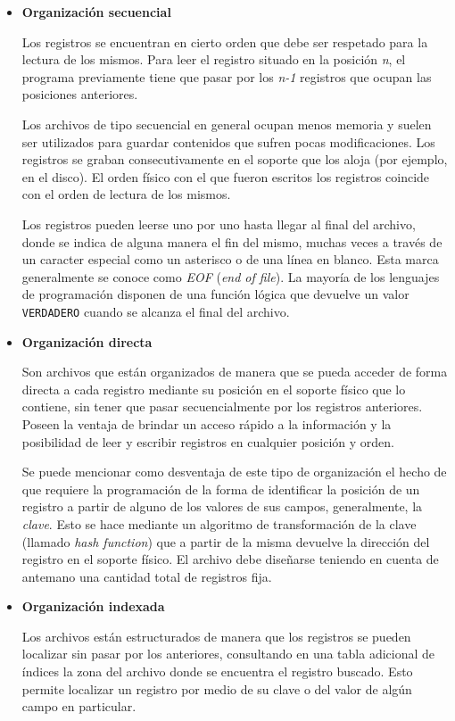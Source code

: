 \documentclass[
]{book}
\begin{document}
\begin{itemize}
\item
  \textbf{Organización secuencial}

  Los registros se encuentran en cierto orden que debe ser respetado para la lectura de los mismos. Para leer el registro situado en la posición \emph{n}, el programa previamente tiene que pasar por los \emph{n-1} registros que ocupan las posiciones anteriores.

  Los archivos de tipo secuencial en general ocupan menos memoria y suelen ser utilizados para guardar contenidos que sufren pocas modificaciones. Los registros se graban consecutivamente en el soporte que los aloja (por ejemplo, en el disco). El orden físico con el que fueron escritos los registros coincide con el orden de lectura de los mismos.

  Los registros pueden leerse uno por uno hasta llegar al final del archivo, donde se indica de alguna manera el fin del mismo, muchas veces a través de un caracter especial como un asterisco o de una línea en blanco. Esta marca generalmente se conoce como \emph{EOF} (\emph{end of file}). La mayoría de los lenguajes de programación disponen de una función lógica que devuelve un valor \texttt{VERDADERO} cuando se alcanza el final del archivo.
\item
  \textbf{Organización directa}

  Son archivos que están organizados de manera que se pueda acceder de forma directa a cada registro mediante su posición en el soporte físico que lo contiene, sin tener que pasar secuencialmente por los registros anteriores. Poseen la ventaja de brindar un acceso rápido a la información y la posibilidad de leer y escribir registros en cualquier posición y orden.

  Se puede mencionar como desventaja de este tipo de organización el hecho de que requiere la programación de la forma de identificar la posición de un registro a partir de alguno de los valores de sus campos, generalmente, la \emph{clave}. Esto se hace mediante un algoritmo de transformación de la clave (llamado \emph{hash function}) que a partir de la misma devuelve la dirección del registro en el soporte físico. El archivo debe diseñarse teniendo en cuenta de antemano una cantidad total de registros fija.
\item
  \textbf{Organización indexada}

  Los archivos están estructurados de manera que los registros se pueden localizar sin pasar por los anteriores, consultando en una tabla adicional de índices la zona del archivo donde se encuentra el registro buscado. Esto permite localizar un registro por medio de su clave o del valor de algún campo en particular.


\end{itemize}
\end{document}
